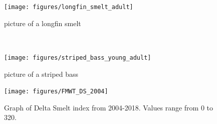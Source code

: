 \documentclass[
]{book}
\begin{document}
\begin{panel-grid}
\begin{columns-nocenter}
\begin{column800}

\begin{figure}

{\centering \texttt{[image: figures/longfin\_smelt\_adult]} 

}

\caption{picture of a longfin smelt}\label{fig:unnamed-chunk-137}
\end{figure}

\end{column800}

\begin{column40}

~

\end{column40}

\begin{column800}

\begin{figure}

{\centering \texttt{[image: figures/striped\_bass\_young\_adult]} 

}

\caption{picture of a striped bass}\label{fig:unnamed-chunk-138}
\end{figure}

\end{column800}

\end{columns-nocenter}

\begin{columns-nocenter}

\begin{column800}

\begin{expand}

\begin{figure}
\texttt{[image: figures/FMWT\_DS\_2004]} \caption{Graph of Delta Smelt index from 2004-2018. Values range from 0 to 320.}\label{fig:unnamed-chunk-139}
\end{figure}

\end{expand}

\end{column800}

\begin{column40}

~

\end{column40}

\begin{column800}


\end{column800}
\end{columns-nocenter}
\end{panel-grid}
\end{document}

